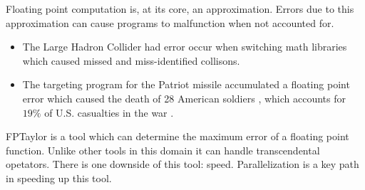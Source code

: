 \documentclass[landscape,a0paper,fontscale=0.32]{baposter} %
\newcommand{\compresslist}{
\setlength{\itemsep}{1pt}
\setlength{\parskip}{0pt}
\setlength{\parsep}{0pt}
}
\begin{document}
\begin{poster}
{  %

  Floating point computation is, at its core, an approximation. Errors due to this approximation can
  cause programs to malfunction when not accounted for.
  \begin{itemize}\compresslist
  \item The Large Hadron Collider had error occur when switching math libraries which caused
    missed and miss-identified collisons. \cite{bailey2013high}
  \item The targeting program for the Patriot missile accumulated a floating point error which
    caused the death of 28 American soldiers \cite{blair1992patriot}, which accounts for $19\%$
    of U.S. casualties in the war \cite{leland2010american}.
  \end{itemize}
  FPTaylor \cite{fm2015-sjrg} is a tool which can determine the maximum error of a floating point
  function. Unlike other tools in this domain it can handle transcendental opetators. There is one
  downside of this tool: speed. Parallelization is a key path in speeding up this tool.
}






\end{poster}
\end{document}
